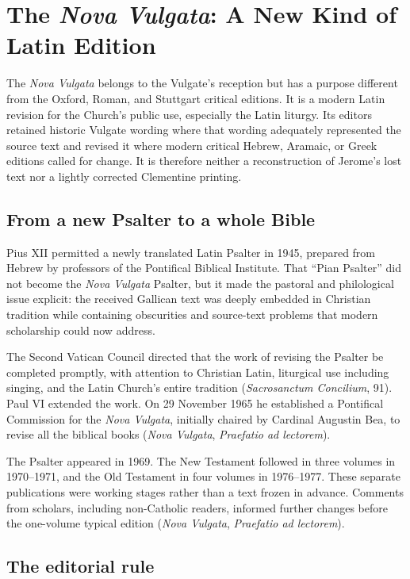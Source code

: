 \section{The \emph{Nova Vulgata}: A New Kind of Latin Edition}

The \emph{Nova Vulgata} belongs to the Vulgate's reception but has a purpose different from the Oxford, Roman, and Stuttgart critical editions. It is a modern Latin revision for the Church's public use, especially the Latin liturgy. Its editors retained historic Vulgate wording where that wording adequately represented the source text and revised it where modern critical Hebrew, Aramaic, or Greek editions called for change. It is therefore neither a reconstruction of Jerome's lost text nor a lightly corrected Clementine printing.

\subsection{From a new Psalter to a whole Bible}

Pius XII permitted a newly translated Latin Psalter in 1945, prepared from Hebrew by professors of the Pontifical Biblical Institute. That ``Pian Psalter'' did not become the \emph{Nova Vulgata} Psalter, but it made the pastoral and philological issue explicit: the received Gallican text was deeply embedded in Christian tradition while containing obscurities and source-text problems that modern scholarship could now address.

The Second Vatican Council directed that the work of revising the Psalter be completed promptly, with attention to Christian Latin, liturgical use including singing, and the Latin Church's entire tradition (\emph{Sacrosanctum Concilium}, 91). Paul VI extended the work. On 29 November 1965 he established a Pontifical Commission for the \emph{Nova Vulgata}, initially chaired by Cardinal Augustin Bea, to revise all the biblical books (\emph{Nova Vulgata}, \emph{Praefatio ad lectorem}).

The Psalter appeared in 1969. The New Testament followed in three volumes in 1970--1971, and the Old Testament in four volumes in 1976--1977. These separate publications were working stages rather than a text frozen in advance. Comments from scholars, including non-Catholic readers, informed further changes before the one-volume typical edition (\emph{Nova Vulgata}, \emph{Praefatio ad lectorem}).

\subsection{The editorial rule}

